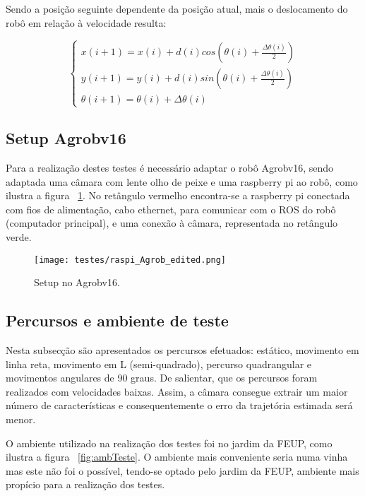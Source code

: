 Sendo a posição seguinte dependente da posição atual, mais o deslocamento do robô em relação à velocidade resulta:

\[ \left\{\begin{array}{ccc}
x(i+1) = x(i) + d(i) cos( \theta(i) + \frac{\Delta \theta(i)}{2})\\ 
y(i+1) = y(i) + d(i) sin( \theta(i) + \frac{\Delta \theta(i)}{2})\\ 
\theta (i+1) = \theta (i) + \Delta \theta (i)
\end{array}\right. \]



\subsection{Setup Agrobv16}


Para a realização destes testes é necessário adaptar o robô Agrobv16, sendo adaptada uma câmara com lente olho de peixe e uma raspberry pi ao robô, como ilustra a figura ~\ref{fig:adptPicam}. No retângulo vermelho encontra-se a raspberry pi conectada com fios de alimentação, cabo ethernet, para comunicar com o ROS do robô (computador principal), e uma conexão à câmara, representada no retângulo verde.


\begin{figure}[h!] 
	\begin{center}
		\leavevmode		
		\texttt{[image: testes/raspi\_Agrob\_edited.png]}
		\caption{Setup no Agrobv16.}
		\label{fig:adptPicam}
	\end{center}
\end{figure}


\FloatBarrier
\subsection{Percursos e ambiente de teste}


Nesta subsecção são apresentados os percursos efetuados: estático, movimento em linha reta, movimento em L (semi-quadrado), percurso quadrangular e movimentos angulares de 90 graus. De salientar, que os percursos foram realizados com velocidades baixas. Assim, a câmara consegue extrair um maior número de características e consequentemente o erro da trajetória estimada será menor. 


O ambiente utilizado na realização dos testes foi no  jardim da FEUP, como ilustra a figura ~\ref{fig:ambTeste}. O ambiente mais conveniente seria numa vinha mas este não foi o possível, tendo-se optado pelo jardim da FEUP, ambiente mais propício para a realização dos testes. 


